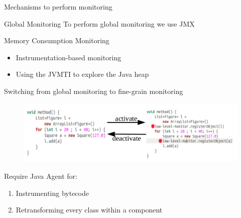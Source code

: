 \documentclass[10pt,xcolor={dvipsnames}]{beamer}
\begin{document}
	\begin{frame}{Mechanisms to perform monitoring}
		\begin{footnotesize}
			\begin{alertblock}{Global Monitoring}
				To perform global monitoring we use JMX
			\end{alertblock}
		\end{footnotesize}
		\begin{footnotesize}
			\begin{alertblock}{Memory Consumption Monitoring}
				\begin{itemize}
					\item Instrumentation-based monitoring
					\item Using the JVMTI to explore the Java heap
				\end{itemize}
			\end{alertblock}
		\end{footnotesize} 
		\begin{alertblock}{Switching from global monitoring to fine-grain monitoring}
			\begin{figure}
				\centering
				\includegraphics[scale=0.27]{fig/activate-deactivate.png}
			\end{figure}
			\vspace{-.5cm}
			\begin{footnotesize}
				Require Java Agent for:
				\begin{enumerate}[i]
					\item Instrumenting bytecode
					\item Retransforming every class within a component
				\end{enumerate}
			\end{footnotesize}
		\end{alertblock}
	\end{frame}
	
\end{document}
